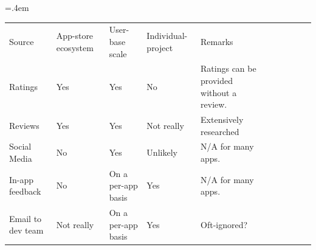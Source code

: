 \begin{table}[H]
\tabcolsep=.4em %
\def\arraystretch{0.8}%
\begin{adjustbox}{max width=\textwidth}
\begin{tabular}{p{2.7cm}p{3.12cm}p{3.7cm}p{3.17cm}p{3.17cm}p{2.7cm}p{3.12cm}p{3.7cm}p{3.17cm}p{3.17cm}}
\multicolumn{1}{p{2.7cm}}{\raggedright{\scriptsize Source}} & 
\multicolumn{1}{p{3.12cm}}{\raggedright{\scriptsize App-store ecosystem}} & 
\multicolumn{1}{p{3.7cm}}{\raggedright{\scriptsize User-base scale}} & 
\multicolumn{1}{p{3.17cm}}{\raggedright{\scriptsize Individual-project}} & 
\multicolumn{1}{p{3.17cm}}{\raggedright{\scriptsize Remarks}} \\ 

\multicolumn{1}{p{2.7cm}}{\raggedright{\scriptsize Ratings}} & 
\multicolumn{1}{p{3.12cm}}{\raggedright{\scriptsize Yes}} & 
\multicolumn{1}{p{3.7cm}}{\raggedright{\scriptsize Yes}} & 
\multicolumn{1}{p{3.17cm}}{\raggedright{\scriptsize No}} & 
\multicolumn{1}{p{3.17cm}}{\raggedright{\scriptsize Ratings can be provided without a review.}} \\ 

\multicolumn{1}{p{2.7cm}}{\raggedright{\scriptsize Reviews}} & 
\multicolumn{1}{p{3.12cm}}{\raggedright{\scriptsize Yes}} & 
\multicolumn{1}{p{3.7cm}}{\raggedright{\scriptsize Yes}} & 
\multicolumn{1}{p{3.17cm}}{\raggedright{\scriptsize Not really}} & 
\multicolumn{1}{p{3.17cm}}{\raggedright{\scriptsize Extensively researched}} \\ 

\multicolumn{1}{p{2.7cm}}{\raggedright{\scriptsize Social Media}} & 
\multicolumn{1}{p{3.12cm}}{\raggedright{\scriptsize No}} & 
\multicolumn{1}{p{3.7cm}}{\raggedright{\scriptsize Yes}} & 
\multicolumn{1}{p{3.17cm}}{\raggedright{\scriptsize Unlikely}} & 
\multicolumn{1}{p{3.17cm}}{\raggedright{\scriptsize N/A for many apps.}} \\ 

\multicolumn{1}{p{2.7cm}}{\raggedright{\scriptsize In-app feedback}} & 
\multicolumn{1}{p{3.12cm}}{\raggedright{\scriptsize No}} & 
\multicolumn{1}{p{3.7cm}}{\raggedright{\scriptsize On a per-app basis}} & 
\multicolumn{1}{p{3.17cm}}{\raggedright{\scriptsize Yes}} & 
\multicolumn{1}{p{3.17cm}}{\raggedright{\scriptsize N/A for many apps.}} \\ 

\multicolumn{1}{p{2.7cm}}{\raggedright{\scriptsize Email to dev team}} & 
\multicolumn{1}{p{3.12cm}}{\raggedright{\scriptsize Not really}} & 
\multicolumn{1}{p{3.7cm}}{\raggedright{\scriptsize On a per-app basis}} & 
\multicolumn{1}{p{3.17cm}}{\raggedright{\scriptsize Yes}} & 
\multicolumn{1}{p{3.17cm}}{\raggedright{\scriptsize Oft-ignored?}} \\ 


\end{tabular}
\end{adjustbox}
\end{table}
